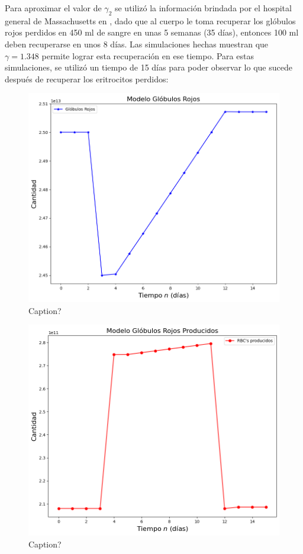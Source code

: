 Para aproximar el valor de $\gamma_2$ se utilizó la información brindada por el hospital general de Massachusetts en \cite{Massachusetts}, dado que al cuerpo le toma recuperar los glóbulos rojos perdidos en 450 ml de sangre en unas 5 semanas (35 días), entonces 100 ml deben recuperarse en unos 8 días. Las simulaciones hechas muestran que $\gamma=1.348$ permite lograr esta recuperación en ese tiempo.
Para estas simulaciones, se utilizó un tiempo de 15 días para poder observar lo que sucede después de recuperar los eritrocitos perdidos:

\begin{figure}[H]
    \centering
    \includegraphics[scale=0.57]{figures/HemoLeveG13RBC.png}
    \caption{Caption?}
    \label{sec:variaciones:fig:HemoLeveG13RBC}
\end{figure}

\begin{figure}[H]
    \centering
    \includegraphics[scale=0.57]{figures/HemoLeveG13SC.png}
    \caption{Caption?}
    \label{sec:variaciones:fig:HemoLeveG13SC}
\end{figure}

